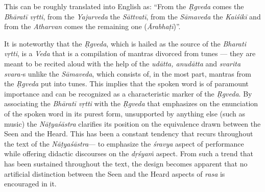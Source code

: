 This can be roughly translated into English as: “From the \textsl{Ṛgveda} comes the \textsl{Bhāratī vṛtti}, from the \textsl{Yajurveda} the \textsl{Sāttvatī}, from the \textsl{Sāmaveda} the \textsl{Kaiśikī} and from the \textsl{Atharvan} comes the remaining one (\textsl{Ārabhaṭī})”. 

It is noteworthy that the \textsl{Ṛgveda}, which is hailed as the source of the \textsl{Bharati vṛtti}, is a \textsl{Veda} that is a compilation of mantras divorced from tunes --- they are meant to be recited aloud with the help of the \textsl{udātta, anudātta} and \textsl{svarita svara-}s unlike the \textsl{Sāmaveda}, which consists of, in the most part, mantras from the \textsl{Ṛgveda} put into tunes. This implies that the spoken word is of paramount importance and can be recognized as a characteristic marker of the \textsl{Ṛgveda}. By associating the \textsl{Bhāratī vṛtti} with the \textsl{Ṛgveda} that emphasizes on the enunciation of the spoken word in its purest form, unsupported by anything else (such as music) the \textsl{Nāṭyaśāstra} clarifies its position on the equivalence drawn between the Seen and the Heard. This has been a constant tendency that recurs throughout the text of the \textsl{Nāṭyaśāstra}--- to emphasize the \textsl{śravya} aspect of performance while offering didactic discourses on the \textsl{dṛśyaṁ} aspect. From such a trend that has been sustained throughout the text, the design becomes apparent that no artificial distinction between the Seen and the Heard aspects of \textsl{rasa} is encouraged in it.

